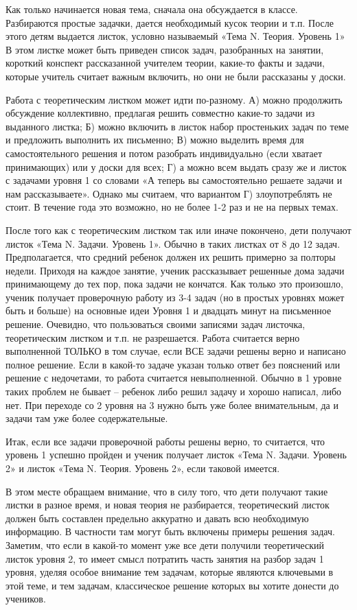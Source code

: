 Как только начинается новая тема, сначала она обсуждается в классе. Разбираются простые задачки, дается необходимый кусок теории и т.п. После этого детям выдается листок, условно называемый «Тема N. Теория. Уровень 1» В этом листке может быть приведен список задач, разобранных на занятии, короткий конспект рассказанной учителем теории, какие-то факты и задачи, которые учитель считает важным включить, но они не были рассказаны у доски. 

Работа с теоретическим листком может идти по-разному. А) можно продолжить обсуждение коллективно, предлагая решить совместно какие-то задачи из выданного листка; Б) можно включить в листок набор простеньких задач по теме и предложить выполнить их письменно; В) можно выделить время для самостоятельного решения и потом разобрать индивидуально (если хватает принимающих) или у доски для всех; Г) а можно всем выдать сразу же и листок с задачами уровня 1 со словами «А теперь вы самостоятельно решаете задачи и нам рассказываете». Однако мы считаем, что вариантом Г) злоупотреблять не стоит. В течение года это возможно, но не более 1-2 раз и не на первых темах.

После того как с теоретическим листком так или иначе покончено, дети получают листок «Тема N. Задачи. Уровень 1». Обычно в таких листках от 8 до 12 задач. Предполагается, что средний ребенок должен их решить примерно за полторы недели. Приходя на каждое занятие, ученик рассказывает решенные дома задачи принимающему до тех пор, пока задачи не кончатся. Как только это произошло, ученик получает проверочную работу из 3-4 задач (но в простых уровнях может быть и больше) на основные идеи Уровня 1 и двадцать минут на письменное решение. Очевидно, что пользоваться своими записями задач листочка, теоретическим листком и т.п. не разрешается. 
Работа считается верно выполненной ТОЛЬКО в том случае, если ВСЕ задачи решены верно и написано полное решение. Если в какой-то задаче указан только ответ без пояснений или решение с недочетами, то работа считается невыполненной. Обычно в 1 уровне таких проблем не бывает – ребенок либо решил задачу и хорошо написал, либо нет. При переходе со 2 уровня на 3 нужно быть уже более внимательным, да и задачи там уже более содержательные.

Итак, если все задачи проверочной работы решены верно, то считается, что уровень 1 успешно пройден и ученик получает листок «Тема N. Задачи. Уровень 2» и листок «Тема N. Теория. Уровень 2», если таковой имеется.

В этом месте обращаем внимание, что в силу того, что дети получают такие листки в разное время, и новая теория не разбирается, теоретический листок должен быть составлен предельно аккуратно и давать всю необходимую информацию. В частности там могут быть включены примеры решения задач. Заметим, что если в какой-то момент уже все дети получили теоретический листок уровня 2, то имеет смысл потратить часть занятия на разбор задач 1 уровня, уделяя особое внимание тем задачам, которые являются ключевыми в этой теме, и тем задачам, классическое решение которых вы хотите донести до учеников.

